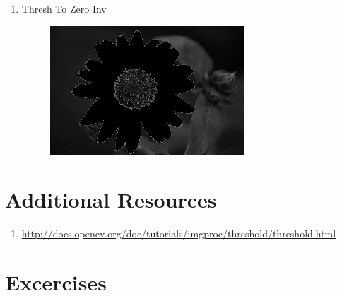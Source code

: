 \documentclass[]{article}
\providecommand{\tightlist}{%
  \setlength{\itemsep}{0pt}\setlength{\parskip}{0pt}}
\begin{document}
\begin{enumerate}
\begin{figure}[h]
  \end{figure}
\item Thresh To Zero Inv\\
  \begin{figure}[h]
  	\includegraphics{ThreshToZeroInv.jpg}
  \end{figure}
\end{enumerate}

\newpage
\section{Additional Resources}\label{additional-resources}

\begin{enumerate}
\def\labelenumi{\arabic{enumi})}
\tightlist
\item
  \url{http://docs.opencv.org/doc/tutorials/imgproc/threshold/threshold.html}
\end{enumerate}

\section{Excercises}\label{excercises}
\end{document}
